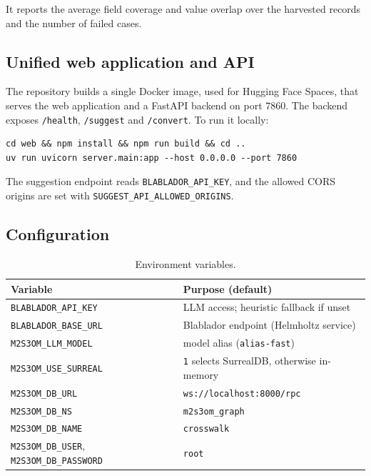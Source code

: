 \documentclass[10pt,twocolumn,a4paper]{extarticle}
\begin{document}
It reports the average field coverage and value overlap over the harvested
records and the number of failed cases.

\subsection{Unified web application and API}

The repository builds a single Docker image, used for Hugging Face Spaces,
that serves the web application and a FastAPI backend on port 7860. The
backend exposes \texttt{/health}, \texttt{/suggest} and \texttt{/convert}.
To run it locally:

\begin{lstlisting}
cd web && npm install && npm run build && cd ..
uv run uvicorn server.main:app --host 0.0.0.0 --port 7860
\end{lstlisting}

The suggestion endpoint reads \texttt{BLABLADOR\_API\_KEY}, and the allowed
CORS origins are set with \texttt{SUGGEST\_API\_ALLOWED\_ORIGINS}.

\subsection{Configuration}

\begin{table}[h]
  \centering\footnotesize
  \caption{Environment variables.}
  \label{tab:env}
  \begin{tabular}{@{}p{}p{}@{}}
    \toprule
    Variable & Purpose (default) \\
    \midrule
    \texttt{BLABLADOR\_API\_KEY} & LLM access; heuristic fallback if unset \\
    \texttt{BLABLADOR\_BASE\_URL} & Blablador endpoint (Helmholtz service) \\
    \texttt{M2S3OM\_LLM\_MODEL} & model alias (\texttt{alias-fast}) \\
    \texttt{M2S3OM\_USE\_SURREAL} & \texttt{1} selects SurrealDB, otherwise in-memory \\
    \texttt{M2S3OM\_DB\_URL} & \texttt{ws://localhost:8000/rpc} \\
    \texttt{M2S3OM\_DB\_NS} & \texttt{m2s3om\_graph} \\
    \texttt{M2S3OM\_DB\_NAME} & \texttt{crosswalk} \\
    \texttt{M2S3OM\_DB\_USER}, \texttt{M2S3OM\_DB\_PASSWORD} & \texttt{root} \\
    \bottomrule
  \end{tabular}
\end{table}
\end{document}
